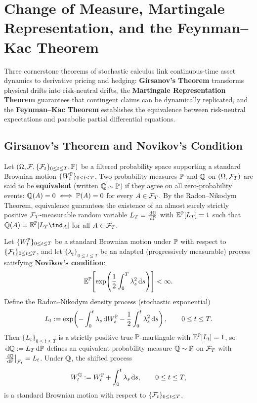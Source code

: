 \section{Change of Measure, Martingale Representation, and the Feynman--Kac Theorem}
\label{sec:girsanov-mrt-fk}

Three cornerstone theorems of stochastic calculus link continuous-time asset dynamics to derivative pricing and hedging: \textbf{Girsanov's Theorem} transforms physical drifts into risk-neutral drifts, the \textbf{Martingale Representation Theorem} guarantees that contingent claims can be dynamically replicated, and the \textbf{Feynman--Kac Theorem} establishes the equivalence between risk-neutral expectations and parabolic partial differential equations.

\subsection{Girsanov's Theorem and Novikov's Condition}
\label{subsec:girsanov}

Let $(\Omega, \mathcal{F}, \{\mathcal{F}_t\}_{0 \le t \le T}, \mathbb{P})$ be a filtered probability space supporting a standard Brownian motion $\{W_t^{\mathbb{P}}\}_{0 \le t \le T}$. Two probability measures $\mathbb{P}$ and $\mathbb{Q}$ on $(\Omega, \mathcal{F}_T)$ are said to be \textbf{equivalent} (written $\mathbb{Q} \sim \mathbb{P}$) if they agree on all zero-probability events: $\mathbb{Q}(A) = 0 \iff \mathbb{P}(A) = 0$ for every $A \in \mathcal{F}_T$. By the Radon--Nikodym Theorem, equivalence guarantees the existence of an almost surely strictly positive $\mathcal{F}_T$-measurable random variable $L_T = \frac{\,\mathrm{d}\mathbb{Q}}{\,\mathrm{d}\mathbb{P}}$ with $\mathbb{E}^{\mathbb{P}}[L_T] = 1$ such that $\Q(A) = \E^{\Prob}[L_T \ind_A]$ for all $A \in \mathcal{F}_T$.

\begin{theorem}
\label{thm:girsanov}
Let $\{W_t^{\mathbb{P}}\}_{0 \le t \le T}$ be a standard Brownian motion under $\mathbb{P}$ with respect to $\{\mathcal{F}_t\}_{0 \le t \le T}$, and let $\{\lambda_t\}_{0 \le t \le T}$ be an adapted (progressively measurable) process satisfying \textbf{Novikov's condition}:
\begin{equation}
\label{eq:novikov}
\mathbb{E}^{\mathbb{P}}\!\left[\exp\!\left(\frac{1}{2}\int_0^T \lambda_s^2 \,\mathrm{d} s\right)\right] < \infty.
\end{equation}
Define the Radon--Nikodym density process (stochastic exponential)
\begin{equation}
\label{eq:radon-nikodym-density}
L_t := \exp\!\left(-\int_0^t \lambda_s \,\mathrm{d} W_s^{\mathbb{P}} - \frac{1}{2}\int_0^t \lambda_s^2 \,\mathrm{d} s\right), \qquad 0 \le t \le T.
\end{equation}
Then $\{L_t\}_{0 \le t \le T}$ is a strictly positive true $\mathbb{P}$-martingale with $\mathbb{E}^{\mathbb{P}}[L_t] = 1$, so $\,\mathrm{d}\mathbb{Q} := L_T \,\mathrm{d}\mathbb{P}$ defines an equivalent probability measure $\mathbb{Q} \sim \mathbb{P}$ on $\mathcal{F}_T$ with $\left.\frac{\,\mathrm{d}\mathbb{Q}}{\,\mathrm{d}\mathbb{P}}\right|_{\mathcal{F}_t} = L_t$. Under $\mathbb{Q}$, the shifted process
\begin{equation}
\label{eq:girsanov-bm}
W_t^{\mathbb{Q}} := W_t^{\mathbb{P}} + \int_0^t \lambda_s \,\mathrm{d} s, \qquad 0 \le t \le T,
\end{equation}
is a standard Brownian motion with respect to $\{\mathcal{F}_t\}_{0 \le t \le T}$.
\end{theorem}

